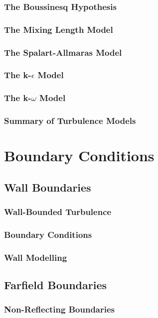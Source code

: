 \subsection{The Boussinesq Hypothesis}
\subsection{The Mixing Length Model}
\subsection{The Spalart-Allmaras Model}
\subsection{The k-$\epsilon$ Model}
\subsection{The k-$\omega$ Model}
\subsection{Summary of Turbulence Models}

\chapter{Boundary Conditions}
\section{Wall Boundaries}
\subsection{Wall-Bounded Turbulence}
\subsection{Boundary Conditions}
\subsection{Wall Modelling}
\section{Farfield Boundaries}
\subsection{Non-Reflecting Boundaries}